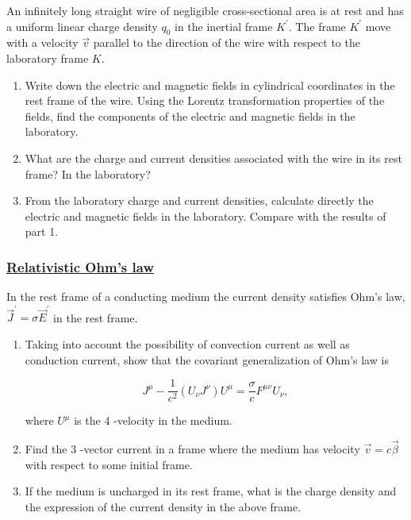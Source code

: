 An infinitely long straight wire of negligible cross-sectional area is at rest and has a uniform linear charge density $q_{0}$ in the inertial frame $K^{\prime} .$ The frame $K^{\prime}$ move with a velocity $\vec{v}$ parallel to the direction of the wire with respect to the laboratory frame $K$.

\begin{enumerate}
	\item Write down the electric and magnetic fields in cylindrical coordinates in the rest frame of the wire. Using the Lorentz transformation properties of the fields, find the components of the electric and magnetic fields in the laboratory.
	\item What are the charge and current densities associated with the wire in its rest frame? In the laboratory?
	\item From the laboratory charge and current densities, calculate directly the electric and magnetic fields in the laboratory. Compare with the results of part 1.
\end{enumerate}

\subsubsection{\hyperref[Relativistic Ohm's law]{Relativistic Ohm's law}}

In the rest frame of a conducting medium the current density satisfies Ohm's law, $\vec{J}^{\prime}=\sigma \vec{E}^{\prime}$ in the rest frame.

\begin{enumerate}
	\item Taking into account the possibility of convection current as well as conduction current, show that the covariant generalization of Ohm's law is
	
	\begin{equation}
		J^{\mu}-\frac{1}{c^{2}}\left(U_{\nu} J^{\nu}\right) U^{\mu}=\frac{\sigma}{c} F^{\mu \nu} U_{\nu},
	\end{equation}

	where $U^{\mu}$ is the 4 -velocity in the medium.
	\item Find the 3 -vector current in a frame where the medium has velocity $\vec{v}=c \vec{\beta}$ with respect to some initial frame.
	\item If the medium is uncharged in its rest frame, what is the charge density and the expression of the current density in the above frame.
\end{enumerate}

